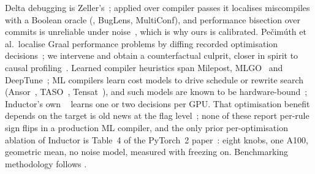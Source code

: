 Delta debugging is Zeller's~\cite{zeller}; applied over compiler passes it localises miscompiles with a Boolean oracle
(, BugLens, MultiConf), and performance bisection over commits is unreliable under noise~\cite{emse22},
which is why ours is calibrated. Pe\v{c}im\'uth et al.\ localise Graal performance problems by diffing recorded
optimisation decisions~\cite{mplr23}; we intervene and obtain a counterfactual culprit, closer in spirit to causal
profiling~\cite{coz}. Learned compiler heuristics span Milepost, MLGO~\cite{mlgo} and DeepTune~\cite{deeptune};
ML compilers learn cost models to drive schedule or rewrite search (Ansor~\cite{ansor}, TASO~\cite{taso},
Tensat~\cite{tensat}), and such models are known to be hardware-bound~\cite{tlp}; Inductor's own
~\cite{autoheuristic} learns one or two decisions per GPU. That optimisation benefit depends on the
target is old news at the flag level~\cite{pallister13,magni14}; none of these report per-rule sign flips in a production
ML compiler, and the only prior per-optimisation ablation of Inductor is Table~4 of the PyTorch~2 paper~\cite{pt2}: eight
knobs, one A100, geometric mean, no noise model, measured with freezing on. Benchmarking methodology follows
\cite{hoefler15,mytkowicz09,stabilizer,vmwarmup}.
